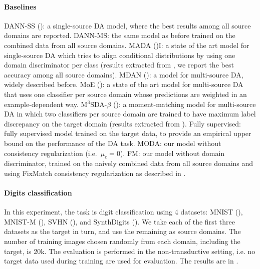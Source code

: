 \paragraph{Baselines} DANN-SS (\citet{Ganin2015}): a single-source DA model, where the best results among all source domains are reported. DANN-MS: the same model as before trained on the combined data from all source domains. MADA (\citet{Pei2018})I: a state of the art model for single-source DA which tries to align conditional distributions by using one domain discriminator per class (results extracted from \citet{Pei2018}, we report the best accuracy among all source domains). MDAN (\citet{Zhao2018}): a model for multi-source DA, widely described before. MoE (\citet{Guo2018}): a state of the art model for multi-source DA that uses one classifier per source domain whose predictions are weighted in an example-dependent way. M$^3$SDA-$\beta$ (\citet{Peng2019}): a moment-matching model for multi-source DA in which two classifiers per source domain are trained to have maximum label discrepancy on the target domain (results extracted from \citet{Peng2019}). Fully supervised: fully supervised model trained on the target data, to provide an empirical upper bound on the performance of the DA task. MODA: our model without consistency regularization (i.e.\ $\mu_c = 0$). FM: our model without domain discriminator, trained on the naively combined data from all source domains and using FixMatch consistency regularization as described in .

\paragraph{Digits classification} In this experiment, the task is digit classification using 4 datasets: MNIST (\citet{LeCun1998}), MNIST-M (\citet{Ganin2015}), SVHN (\citet{Netzer2011}), and SynthDigits (\citet{Ganin2015}). We take each of the first three datasets as the target in turn, and use the remaining as source domains. The number of training images chosen randomly from each domain, including the target, is 20k. The evaluation is performed in the non-transductive setting, i.e. no target data used during training are used for evaluation. The results are in .


